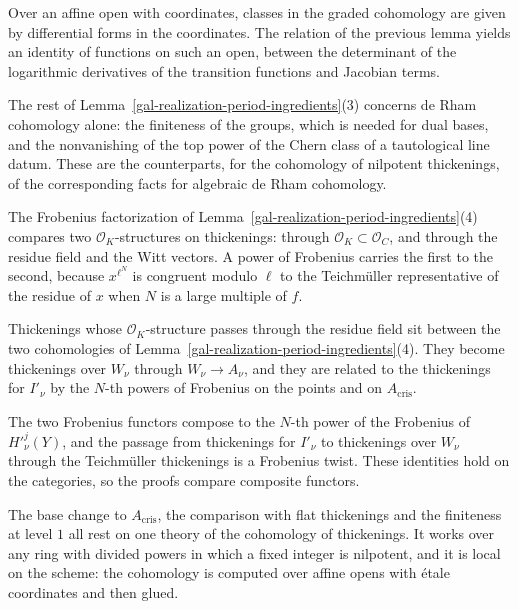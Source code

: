Over an affine open with coordinates, classes in the graded cohomology are given by differential forms in the
coordinates. The relation of the previous lemma yields an identity of functions on such an open, between the
determinant of the logarithmic derivatives of the transition functions and Jacobian terms.

The rest of Lemma~\ref{gal-realization-period-ingredients}(3) concerns de Rham cohomology alone: the finiteness of the
groups, which is needed for dual bases, and the nonvanishing of the top power of the Chern class of a tautological line
datum. These are the counterparts, for the cohomology of nilpotent thickenings, of the corresponding facts for
algebraic de Rham cohomology.

The Frobenius factorization of Lemma~\ref{gal-realization-period-ingredients}(4) compares two $\mathcal O_K$-structures
on thickenings: through $\mathcal O_K\subset\mathcal O_C$, and through the residue field and the Witt vectors. A power
of Frobenius carries the first to the second, because $x^{\ell^N}$ is congruent modulo $\ell$ to the Teichm\"uller
representative of the residue of $x$ when $N$ is a large multiple of $f$.

Thickenings whose $\mathcal O_K$-structure passes through the residue field sit between the two cohomologies of
Lemma~\ref{gal-realization-period-ingredients}(4). They become thickenings over $W_\nu$ through $W_\nu\to A_\nu$, and
they are related to the thickenings for $I'_\nu$ by the $N$-th powers of Frobenius on the points and on
$A_{\mathrm{cris}}$.

The two Frobenius functors compose to the $N$-th power of the Frobenius of $H'^j_\nu(Y)$, and the passage from
thickenings for $I'_\nu$ to thickenings over $W_\nu$ through the Teichm\"uller thickenings is a Frobenius twist. These
identities hold on the categories, so the proofs compare composite functors.

The base change to $A_{\mathrm{cris}}$, the comparison with flat thickenings and the finiteness at level $1$ all rest on
one theory of the cohomology of thickenings. It works over any ring with divided powers in which a fixed integer is
nilpotent, and it is local on the scheme: the cohomology is computed over affine opens with \'etale coordinates and then
glued.

